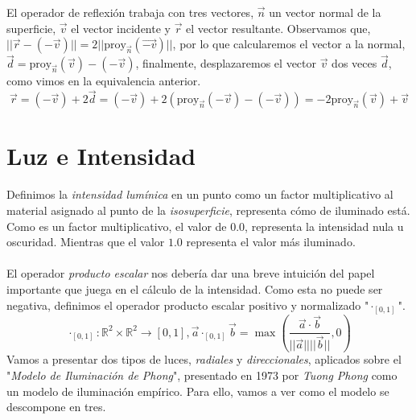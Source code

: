 El operador de reflexión trabaja con tres vectores,  \(\Vec{n}\) un vector normal de la superficie, \(\Vec{v}\) el vector incidente y \(\Vec{r}\) el vector resultante. Observamos que, 
\(\vert\vert \Vec{r}-(-\Vec{v})\vert\vert = 2\vert\vert\text{proy}_{\Vec{n}}(\Vec{-v})\vert\vert\), por lo que calcularemos el vector a la normal, \(\Vec{d}=\text{proy}_{\Vec{n}}(\Vec{v}) - (-\Vec{v})\), finalmente, desplazaremos el vector \(\Vec{v}\) dos veces \(\Vec{d}\), como vimos en la equivalencia anterior.
\[\Vec{r}=(-\Vec{v}) + 2\Vec{d}=(-\Vec{v}) + 2(\text{proy}_{\Vec{n}}(-\Vec{v}) - (-\Vec{v}))= -2\text{proy}_{\Vec{n}}(\Vec{v}) + \Vec{v}\]
\section{Luz e Intensidad}
 Definimos la \textit{intensidad lumínica} en un punto como un factor multiplicativo al material asignado al punto de la \textit{isosuperficie}, representa cómo de iluminado está. Como es un factor multiplicativo, el valor de \(0.0\), representa la intensidad nula u oscuridad. Mientras que el valor \(1.0\) representa el valor más iluminado.\\\\ 
El operador \textit{producto escalar} nos debería dar una breve intuición del papel importante que juega en el cálculo de la intensidad. Como esta no puede ser negativa, definimos el operador producto escalar positivo y normalizado "\(\cdot_{[0,1]}\)".
\[\cdot_{[0,1]}:\mathbb{R}^2\times\mathbb{R}^2\longrightarrow[0,1], \Vec{a}\cdot_{[0,1]}\Vec{b}=\max\left(\dfrac{\Vec{a}\cdot \Vec{b}}{\vert\vert\Vec{a}\vert\vert\vert\vert \Vec{b}\vert\vert}, 0\right)\]
Vamos a presentar dos tipos de luces, \textit{radiales} y \textit{direccionales}, aplicados sobre  el "\textit{Modelo de Iluminación de Phong}", presentado en 1973 por \textit{Tuong Phong} como un modelo de iluminación empírico. Para ello, vamos a ver como el modelo se descompone en tres. 
